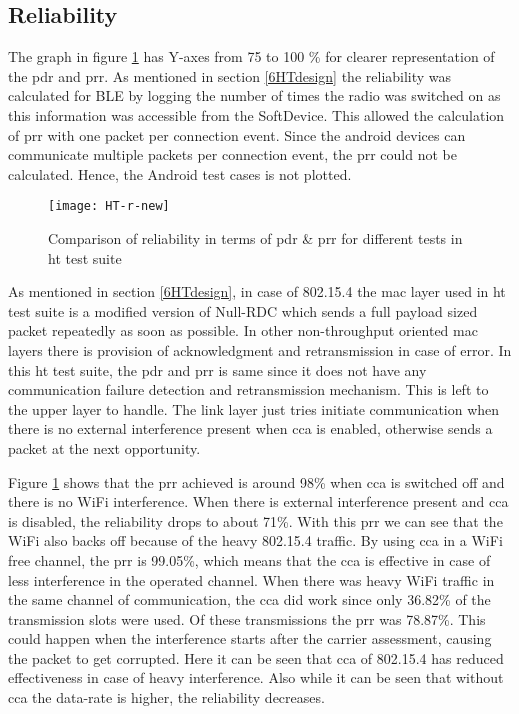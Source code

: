 \subsection{Reliability}
The graph in figure \ref{fig:HT-r} has Y-axes from 75 to 100 \% for clearer representation of the \gls{pdr} and \gls{prr}. As mentioned in section \ref{6HTdesign} the reliability was calculated for BLE by logging the number of times the radio was switched on as this information was accessible from the SoftDevice. This allowed the calculation of \gls{prr} with one packet per connection event. Since the android devices can communicate multiple packets per connection event, the \gls{prr} could not be calculated. Hence, the Android test cases is not plotted.

\begin{figure}[tb]
\texttt{[image: HT-r-new]}
\caption{Comparison of reliability in terms of \gls{pdr} \& \gls{prr} for different tests in \gls{ht} test suite }
\label{fig:HT-r}
\vspace{-6 pt}
\end{figure}

As mentioned in section \ref{6HTdesign}, in case of 802.15.4 the \gls{mac} layer used in \gls{ht} test suite is a modified version of Null-RDC which sends a full payload sized packet repeatedly as soon as possible. In other non-throughput oriented \gls{mac} layers there is provision of acknowledgment and retransmission in case of error. In this \gls{ht} test suite, the \gls{pdr} and \gls{prr} is same since it does not have any communication failure detection and retransmission mechanism. This is left to the upper layer to handle. The link layer just tries initiate communication when there is no external interference present when \gls{cca} is enabled, otherwise sends a packet at the next opportunity. 

Figure \ref{fig:HT-r} shows that the \gls{prr} achieved is around 98\% when \gls{cca} is switched off and there is no WiFi interference. When there is external interference present and \gls{cca} is disabled, the reliability drops to about 71\%. With this \gls{prr} we can see that the WiFi also backs off because of the heavy 802.15.4 traffic. By using \gls{cca} in a WiFi free channel, the \gls{prr} is 99.05\%, which means that the \gls{cca} is effective in case of less interference in the operated channel. When there was heavy WiFi traffic in the same channel of communication, the \gls{cca} did work since only 36.82\% of the transmission slots were used. Of these transmissions the \gls{prr} was 78.87\%. This could happen when the interference starts after the carrier assessment, causing the packet to get corrupted. Here it can be seen that \gls{cca} of 802.15.4 has reduced effectiveness in case of heavy interference. Also while it can be seen that without \gls{cca} the data-rate is higher, the reliability decreases.

